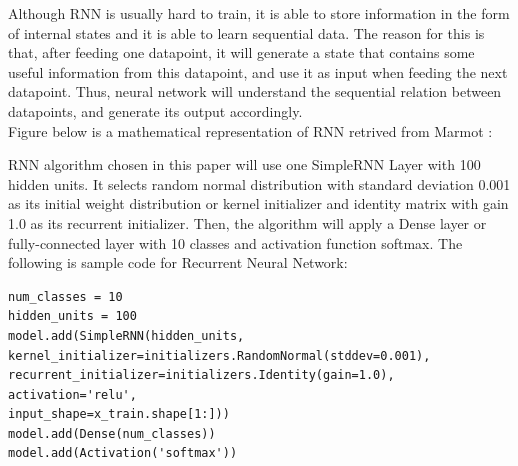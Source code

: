 \documentclass[letterpaper]{article} %
\begin{document}
Although RNN is usually hard to train, it is able to store information in the form of internal states and it is able to learn sequential data. The reason for this is that, after feeding one datapoint, it will generate a state that contains some useful information from this datapoint, and use it as input when feeding the next datapoint. Thus, neural network will understand the sequential relation between datapoints, and generate its output accordingly. \\ 
Figure below is a mathematical representation of RNN retrived from Marmot \cite{StackExchange} :
\begingroup
{} 
\endgroup
\medskip
RNN algorithm chosen in this paper will use one SimpleRNN Layer with 100 hidden units. It selects random normal distribution with standard deviation 0.001 as its initial weight distribution or kernel initializer and identity matrix with gain 1.0 as its recurrent initializer. Then, the algorithm will apply a Dense layer or fully-connected layer with 10 classes and activation function softmax. The following is sample code for Recurrent Neural Network:

\begin{lstlisting}[columns=fullflexible, keepspaces=true, stepnumber=1]
num_classes = 10
hidden_units = 100
model.add(SimpleRNN(hidden_units,
kernel_initializer=initializers.RandomNormal(stddev=0.001),
recurrent_initializer=initializers.Identity(gain=1.0),
activation='relu',
input_shape=x_train.shape[1:]))
model.add(Dense(num_classes))
model.add(Activation('softmax'))
\end{lstlisting}
\end{document}
